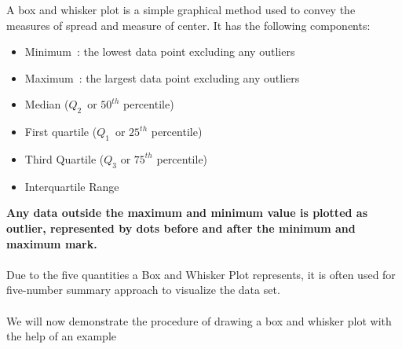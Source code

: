 \documentclass[twoside,12pt]{report}  %
\begin{document}
A box and whisker plot is a simple graphical method used to convey the measures of spread and measure of center. It has the following components:
\begin{itemize}
	\item Minimum : the lowest data point excluding any outliers
	\item Maximum : the largest data point excluding any outliers
	\item Median ($Q_2$ or $50^{th}$ percentile)
	\item First quartile ($Q_1$ or $25^{th}$ percentile)
	\item Third Quartile ($Q_3$ or $75^{th}$ percentile)
	\item Interquartile Range		
\end{itemize}
\noindent
\textbf{Any data outside the maximum and minimum value is plotted as outlier, represented by dots before and after the minimum and maximum mark.}
\\
\\
Due to the five quantities a Box and Whisker Plot represents, it is often used for five-number summary approach to visualize the data set.
\\
\\
We will now demonstrate the procedure of drawing a box and whisker plot with the help of an example
\vfill
\end{document}
